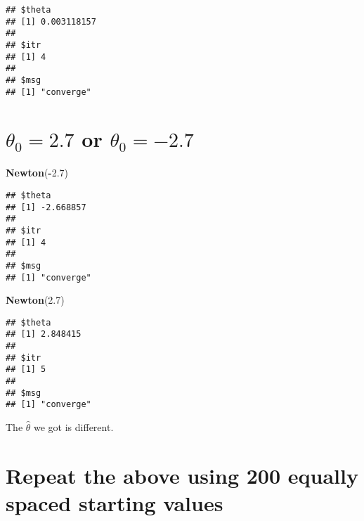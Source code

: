 \documentclass[]{book}
\newenvironment{Shaded}{\begin{snugshade}}{\end{snugshade}}
\newcommand{\KeywordTok}[1]{\textcolor[rgb]{0.13,0.29,0.53}{\textbf{#1}}}
\newcommand{\DataTypeTok}[1]{\textcolor[rgb]{0.13,0.29,0.53}{#1}}
\newcommand{\DecValTok}[1]{\textcolor[rgb]{0.00,0.00,0.81}{#1}}
\newcommand{\FloatTok}[1]{\textcolor[rgb]{0.00,0.00,0.81}{#1}}
\newcommand{\StringTok}[1]{\textcolor[rgb]{0.31,0.60,0.02}{#1}}
\newcommand{\OtherTok}[1]{\textcolor[rgb]{0.56,0.35,0.01}{#1}}
\newcommand{\ControlFlowTok}[1]{\textcolor[rgb]{0.13,0.29,0.53}{\textbf{#1}}}
\newcommand{\OperatorTok}[1]{\textcolor[rgb]{0.81,0.36,0.00}{\textbf{#1}}}
\newcommand{\NormalTok}[1]{#1}
\theoremstyle{definition}
\theoremstyle{definition}
\theoremstyle{definition}
\theoremstyle{remark}
\begin{document}
\begin{verbatim}
## $theta
## [1] 0.003118157
## 
## $itr
## [1] 4
## 
## $msg
## [1] "converge"
\end{verbatim}

\section{\texorpdfstring{\(\theta_0 = 2.7\) or
\(\theta_0 = -2.7\)}{\textbackslash{}theta\_0 = 2.7 or \textbackslash{}theta\_0 = -2.7}}\label{theta_0-2.7-or-theta_0--2.7}

\begin{Shaded}
\begin{Highlighting}[]
\KeywordTok{Newton}\NormalTok{(}\OperatorTok{-}\FloatTok{2.7}\NormalTok{)}
\end{Highlighting}
\end{Shaded}

\begin{verbatim}
## $theta
## [1] -2.668857
## 
## $itr
## [1] 4
## 
## $msg
## [1] "converge"
\end{verbatim}

\begin{Shaded}
\begin{Highlighting}[]
\KeywordTok{Newton}\NormalTok{(}\FloatTok{2.7}\NormalTok{)}
\end{Highlighting}
\end{Shaded}

\begin{verbatim}
## $theta
## [1] 2.848415
## 
## $itr
## [1] 5
## 
## $msg
## [1] "converge"
\end{verbatim}

The \(\hat\theta\) we got is different.

\section{Repeat the above using 200 equally spaced starting
values}\label{repeat-the-above-using-200-equally-spaced-starting-values}

\begin{Shaded}
\end{Shaded}
\end{document}
